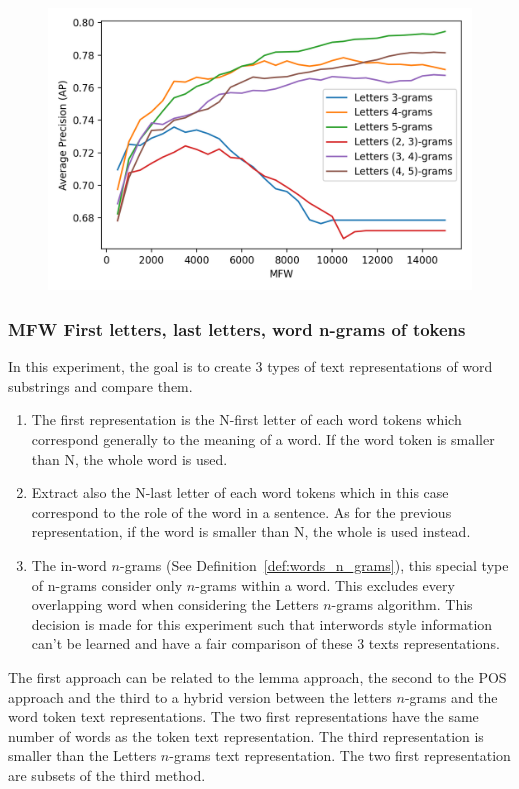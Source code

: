 \begin{figure}
  \label{fig:letter_ngrams_st_jean}
  \includegraphics[width=\linewidth]{img/letter_ngrams_st_jean.png}
\end{figure}

\subsubsection{MFW First letters, last letters, word n-grams of tokens}

In this experiment, the goal is to create 3 types of text representations of word substrings and compare them.

\begin{enumerate}
  \item
  The first representation is the N-first letter of each word tokens which correspond generally to the meaning of a word.
  If the word token is smaller than N, the whole word is used.
  \item
  Extract also the N-last letter of each word tokens which in this case correspond to the role of the word in a sentence.
  As for the previous representation, if the word is smaller than N, the whole is used instead.
  \item
  The in-word $n$-grams (See Definition~\ref{def:words_n_grams}), this special type of n-grams consider only $n$-grams within a word.
  This excludes every overlapping word when considering the Letters $n$-grams algorithm.
  This decision is made for this experiment such that interwords style information can't be learned and have a fair comparison of these 3 texts representations.
\end{enumerate}

The first approach can be related to the lemma approach, the second to the POS approach and the third to a hybrid version between the letters $n$-grams and the word token text representations.
The two first representations have the same number of words as the token text representation.
The third representation is smaller than the Letters $n$-grams text representation.
The two first representation are subsets of the third method.

